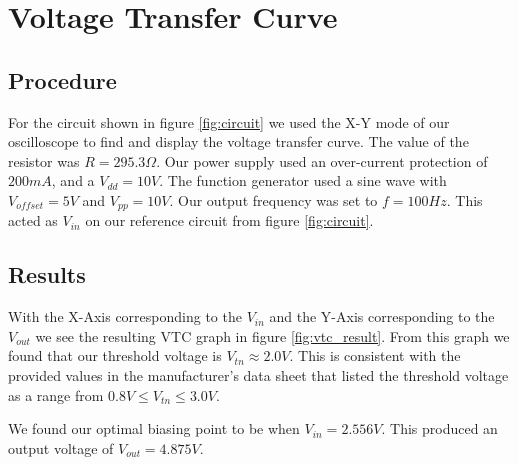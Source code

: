 
\section{Voltage Transfer Curve}

\subsection{Procedure}

For the circuit shown in figure \ref{fig:circuit} we used the X-Y mode of our oscilloscope to find and display the voltage transfer curve. The value of the resistor was $R=295.3 \Omega$. Our power supply used an over-current protection of $200mA$, and a $V_{dd} = 10V$. The function generator used a sine wave with $V_{offset} = 5V$ and $V_{pp} = 10V$. Our output frequency was set to $f = 100 Hz$. This acted as $V_{in}$ on our reference circuit from figure \ref{fig:circuit}.

\FloatBarrier

\subsection{Results}
With the X-Axis corresponding to the $V_{in}$ and the Y-Axis corresponding to the $V_{out}$ we see the resulting VTC graph in figure \ref{fig:vtc_result}. From this graph we found that our threshold voltage is $V_{tn}\approx 2.0V$. This is consistent with the provided values in the manufacturer's data sheet that listed the threshold voltage as a range from $0.8 V \le V_{tn} \le 3.0 V$.

We found our optimal biasing point to be when $V_{in} = 2.556 V$. This produced an output voltage of  $V_{out} = 4.875 V$.


